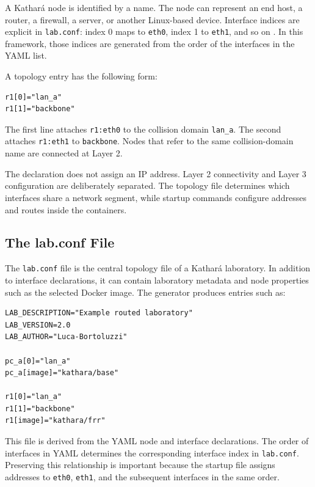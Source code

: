 A Kathar\'a node is identified by a name. The node can represent an end host,
a router, a firewall, a server, or another Linux-based device. Interface
indices are explicit in \texttt{lab.conf}: index 0 maps to \texttt{eth0},
index 1 to \texttt{eth1}, and so on \cite{kathara_labconf_manpage}. In this
framework, those indices are generated from the order of the interfaces in the
YAML list.

A topology entry has the following form:

\begin{lstlisting}[caption={Basic Kathar\'a interface declaration.},label={lst:kathara-interface}]
r1[0]="lan_a"
r1[1]="backbone"
\end{lstlisting}

The first line attaches \texttt{r1:eth0} to the collision domain
\texttt{lan\_a}. The second attaches \texttt{r1:eth1} to
\texttt{backbone}. Nodes that refer to the same collision-domain name are
connected at Layer 2.

The declaration does not assign an IP address. Layer 2 connectivity and Layer
3 configuration are deliberately separated. The topology file determines
which interfaces share a network segment, while startup commands configure
addresses and routes inside the containers.

\subsection{The lab.conf File}
\label{subsec:lab-conf}

The \texttt{lab.conf} file is the central topology file of a Kathar\'a
laboratory. In addition to interface declarations, it can contain laboratory
metadata and node properties such as the selected Docker image. The generator
produces entries such as:

\begin{lstlisting}[caption={Simplified generated lab.conf content.},label={lst:lab-conf-example}]
LAB_DESCRIPTION="Example routed laboratory"
LAB_VERSION=2.0
LAB_AUTHOR="Luca-Bortoluzzi"

pc_a[0]="lan_a"
pc_a[image]="kathara/base"

r1[0]="lan_a"
r1[1]="backbone"
r1[image]="kathara/frr"
\end{lstlisting}

This file is derived from the YAML node and interface declarations. The order
of interfaces in YAML determines the corresponding interface index in
\texttt{lab.conf}. Preserving this relationship is important because the
startup file assigns addresses to \texttt{eth0}, \texttt{eth1}, and the
subsequent interfaces in the same order.

